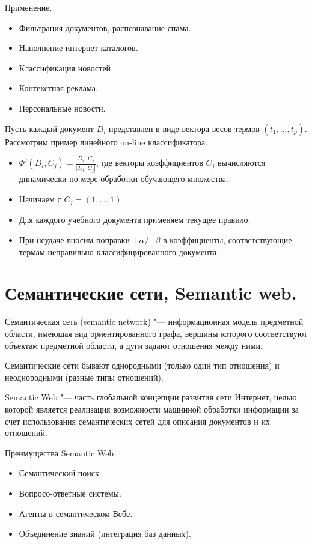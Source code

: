 \documentclass[a4paper,12pt]{article}
\begin{document}
Применение.
\begin{itemize}
\item Фильтрация документов, распознавание спама.
\item Наполнение интернет-каталогов.
\item Классификация новостей.
\item Контекстная реклама.
\item Персональные новости.
\end{itemize}

Пусть каждый документ $D_i$ представлен в виде вектора весов термов
$(t_1,\dots,t_p)$. Рассмотрим пример линейного on-line классификатора.
\begin{itemize}
\item $\Phi'(D_i,C_j)=\frac{D_i\cdot C_j}{|D_i| |C_j|}$, где векторы
коэффициентов $C_j$ вычисляются динамически по мере обработки
обучающего множества.
\item Начинаем с $C_j=(1,\dots,1)$.
\item Для каждого учебного документа применяем текущее правило.
\item При неудаче вносим поправки $+\alpha$/$-\beta$ в коэффициенты,
соответствующие термам неправильно классифицированного документа.
\end{itemize}


\section{Семантические сети, Semantic web.}

Семантическая сеть (semantic network) "--- информационная модель
предметной области, имеющая вид ориентированного графа,
вершины которого соответствуют объектам предметной области,
а дуги задают отношения между ними.

Семантические сети бывают однородными (только один тип отношения)
и неоднородными (разные типы отношений).

Semantic Web "--- часть глобальной концепции развития сети Интернет,
целью которой является реализация возможности машинной обработки
информации за счет использования семантических сетей для описания
документов и их отношений.

Преимущества Semantic Web.
\begin{itemize}
\item Семантический поиск.
\item Вопросо-ответные системы.
\item Агенты в семантическом Вебе.
\item Объединение знаний (интеграция баз данных).
\end{itemize}
\end{document}
